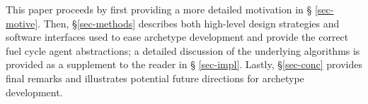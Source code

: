 This paper proceeds by first providing a more detailed motivation in \S
\ref{sec-motive}. Then, \S \ref{sec-methods} describes both high-level design
strategies and software interfaces used to ease archetype development and
provide the correct fuel cycle agent abstractions; a detailed discussion of the
underlying algorithms is provided as a supplement to the reader in \S
\ref{sec-impl}.  Lastly, \S \ref{sec-conc} provides final remarks and
illustrates potential future directions for \cyclus archetype development.
